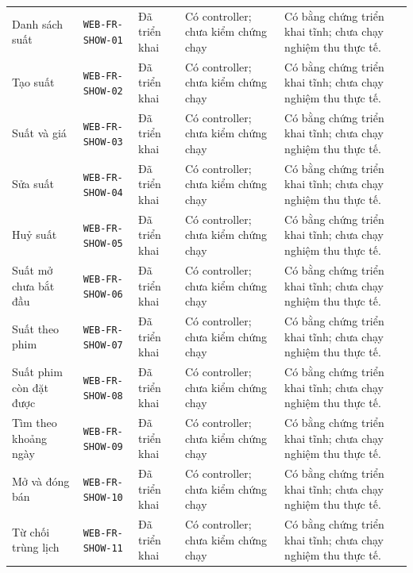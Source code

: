 \begin{longtable}{@{}P{0.19000\SRSWidth}P{0.18000\SRSWidth}P{0.15000\SRSWidth}P{0.20000\SRSWidth}P{0.28000\SRSWidth}@{}}
Danh sách suất & \texttt{WEB-\allowbreak{}FR-\allowbreak{}SHOW-\allowbreak{}01} & Đã triển khai & Có controller; chưa kiểm chứng chạy & Có bằng chứng triển khai tĩnh; chưa chạy nghiệm thu thực tế. \\[3pt]
Tạo suất & \texttt{WEB-\allowbreak{}FR-\allowbreak{}SHOW-\allowbreak{}02} & Đã triển khai & Có controller; chưa kiểm chứng chạy & Có bằng chứng triển khai tĩnh; chưa chạy nghiệm thu thực tế. \\[3pt]
Suất và giá & \texttt{WEB-\allowbreak{}FR-\allowbreak{}SHOW-\allowbreak{}03} & Đã triển khai & Có controller; chưa kiểm chứng chạy & Có bằng chứng triển khai tĩnh; chưa chạy nghiệm thu thực tế. \\[3pt]
Sửa suất & \texttt{WEB-\allowbreak{}FR-\allowbreak{}SHOW-\allowbreak{}04} & Đã triển khai & Có controller; chưa kiểm chứng chạy & Có bằng chứng triển khai tĩnh; chưa chạy nghiệm thu thực tế. \\[3pt]
Huỷ suất & \texttt{WEB-\allowbreak{}FR-\allowbreak{}SHOW-\allowbreak{}05} & Đã triển khai & Có controller; chưa kiểm chứng chạy & Có bằng chứng triển khai tĩnh; chưa chạy nghiệm thu thực tế. \\[3pt]
Suất mở chưa bắt đầu & \texttt{WEB-\allowbreak{}FR-\allowbreak{}SHOW-\allowbreak{}06} & Đã triển khai & Có controller; chưa kiểm chứng chạy & Có bằng chứng triển khai tĩnh; chưa chạy nghiệm thu thực tế. \\[3pt]
Suất theo phim & \texttt{WEB-\allowbreak{}FR-\allowbreak{}SHOW-\allowbreak{}07} & Đã triển khai & Có controller; chưa kiểm chứng chạy & Có bằng chứng triển khai tĩnh; chưa chạy nghiệm thu thực tế. \\[3pt]
Suất phim còn đặt được & \texttt{WEB-\allowbreak{}FR-\allowbreak{}SHOW-\allowbreak{}08} & Đã triển khai & Có controller; chưa kiểm chứng chạy & Có bằng chứng triển khai tĩnh; chưa chạy nghiệm thu thực tế. \\[3pt]
Tìm theo khoảng ngày & \texttt{WEB-\allowbreak{}FR-\allowbreak{}SHOW-\allowbreak{}09} & Đã triển khai & Có controller; chưa kiểm chứng chạy & Có bằng chứng triển khai tĩnh; chưa chạy nghiệm thu thực tế. \\[3pt]
Mở và đóng bán & \texttt{WEB-\allowbreak{}FR-\allowbreak{}SHOW-\allowbreak{}10} & Đã triển khai & Có controller; chưa kiểm chứng chạy & Có bằng chứng triển khai tĩnh; chưa chạy nghiệm thu thực tế. \\[3pt]
Từ chối trùng lịch & \texttt{WEB-\allowbreak{}FR-\allowbreak{}SHOW-\allowbreak{}11} & Đã triển khai & Có controller; chưa kiểm chứng chạy & Có bằng chứng triển khai tĩnh; chưa chạy nghiệm thu thực tế. \\[3pt]

\end{longtable}
